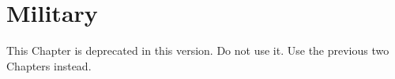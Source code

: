\chapter{Military}\label{chapter:Military}

\begin{designnote}
  This Chapter is deprecated in this version. Do not use it. Use the
  previous two Chapters instead.
\end{designnote}






